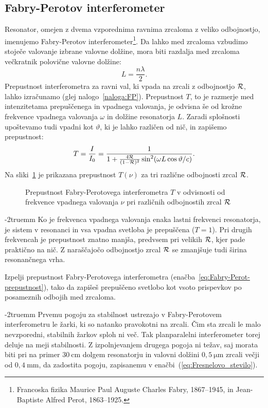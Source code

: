\subsection*{Fabry-Perotov interferometer}
Resonator, omejen z dvema vzporednima ravnima zrcaloma
z veliko odbojnostjo, imenujemo Fabry-Perotov 
interferometer\footnote{Francoska fizika Maurice Paul Auguste Charles Fabry, 1867--1945, in 
Jean-Baptiste Alfred Perot, 1863--1925.}. 
Da lahko med zrcaloma vzbudimo stoječe valovanje izbrane valovne dolžine, mora biti razdalja 
med zrcaloma večkratnik polovične valovne dolžine:
\begin{equation}
L = \frac{n \lambda}{2}.
\end{equation}
Prepustnost interferometra za ravni val, ki vpada na zrcali z
odbojnostjo ${\cal R}$, lahko izračunamo (glej nalogo~\ref{naloga:FP}). Prepustnost $T$, to je 
razmerje med intenzitetama prepuščenega in vpadnega valovanja, je odvisna še
od krožne frekvence vpadnega valovanja $\omega$ in dolžine resonatorja $L$. Zaradi splošnosti upoštevamo
tudi vpadni kot $\vartheta$, ki je lahko različen od nič, in zapišemo prepustnost:
\begin{equation}
T=\frac{I}{I_0} = \frac{1}{1+\frac{4{\cal R}}{(1-{\cal R})^{2}}\sin^{2}(\omega L\cos \vartheta/c)}.
\label{eq:Fabry-Perot-prepustnost}
\end{equation}
Na sliki~\ref{fig:Fabry-Perot} je prikazana prepustnost $T(\nu)$ za tri različne 
odbojnosti zrcal ${\cal R}$.
\begin{figure}[ht]
\centering
\def\svgwidth{85truemm} 

\caption{
Prepustnost Fabry-Perotovega interferometra $T$
v odvisnosti od frekvence vpadnega valovanja $\nu$ pri različnih odbojnostih zrcal ${\cal R}$}
\label{fig:Fabry-Perot}
\end{figure}
\vglue-2truemm
Ko je frekvenca vpadnega valovanja enaka lastni frekvenci
resonatorja, je sistem v resonanci in vsa vpadna svetloba je prepuščena ($T=1$). 
Pri drugih frekvencah je prepustnost znatno manjša, predvsem
pri velikih $\cal{R}$, kjer pade praktično na nič. Z naraščajočo odbojnostjo zrcal ${\cal R}$ 
se zmanjšuje tudi širina resonančnega vrha.
\begin{naloga}
\label{naloga:FP}
Izpelji prepustnost Fabry-Perotovega interferometra (enačba~\ref{eq:Fabry-Perot-prepustnost}), tako da
zapišeš prepuščeno svetlobo kot vsoto prispevkov po posameznih odbojih med zrcaloma. 
\end{naloga}
\vglue-2truemm
Prvemu pogoju za stabilnost ustrezajo v Fabry-Perotovem interferometru
le žarki, ki so natanko pravokotni na zrcali. Čim sta zrcali le
malo nevzporedni, stabilnih žarkov sploh ni več. Tak 
planparalelni interferometer torej deluje 
na meji stabilnosti. Z izpolnjevanjem drugega
pogoja ni težav, saj morata biti pri na primer $30~\si{\centi\metre}$ dolgem resonatorju in 
valovni dolžini $0,5~\si{\micro\metre}$ zrcali večji od $0,4~\si{\milli\metre}$, da zadostita pogoju, 
zapisanemu v enačbi~(\ref{eq:Fresnelovo_stevilo}).

